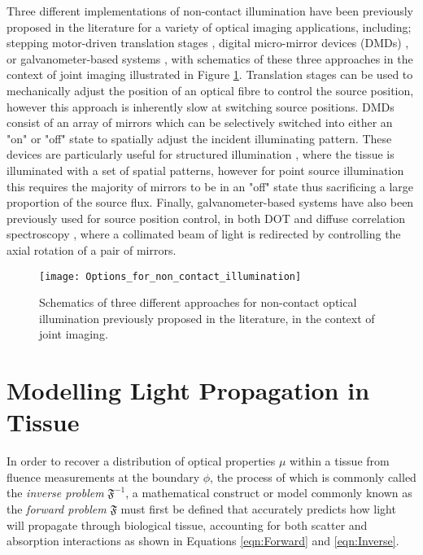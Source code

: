 \documentclass[twoside]{bhamthesis}
\theoremstyle{definition}
\begin{document}
Three different implementations of non-contact illumination have been previously proposed in the literature for a variety of optical imaging applications, including; stepping motor-driven translation stages \cite{hielscher2004sagittal,wu2016development,taylor2016development,lighter2017multispectral}, digital micro-mirror devices (DMDs) \cite{guggenheim2013multi}, or galvanometer-based systems \cite{ren2016non,han2015non}, with schematics of these three approaches in the context of joint imaging illustrated in Figure \ref{fig:Non_contact_approaches}. Translation stages can be used to mechanically adjust the position of an optical fibre to control the source position, however this approach is inherently slow at switching source positions. DMDs consist of an array of mirrors which can be selectively switched into either an "on" or "off" state to spatially adjust the incident illuminating pattern. These devices are particularly useful for structured illumination \cite{belanger2010real}, where the tissue is illuminated with a set of spatial patterns, however for point source illumination this requires the majority of mirrors to be in an "off" state thus sacrificing a large proportion of the source flux. Finally, galvanometer-based systems have also been previously used for source position control, in both DOT \cite{ren2016non} and diffuse correlation spectroscopy \cite{han2015non}, where a collimated beam of light is redirected by controlling the axial rotation of a pair of mirrors. 

\begin{figure}[!ht]
\centering
  \texttt{[image: Options\_for\_non\_contact\_illumination]}
  \caption{Schematics of three different approaches for non-contact optical illumination previously proposed in the literature, in the context of joint imaging.}
\label{fig:Non_contact_approaches}
\end{figure}

\section{Modelling Light Propagation in Tissue}

In order to recover a distribution of optical properties $\mu$ within a tissue from fluence measurements at the boundary $\phi$, the process of which is commonly called the \textit{inverse problem} $\mathfrak{F}^{-1}$, a mathematical construct or model commonly known as the \textit{forward problem} $\mathfrak{F}$ must first be defined that accurately predicts how light will propagate through biological tissue, accounting for both scatter and absorption interactions as shown in Equations \ref{eqn:Forward} and \ref{eqn:Inverse}. 
\end{document}

